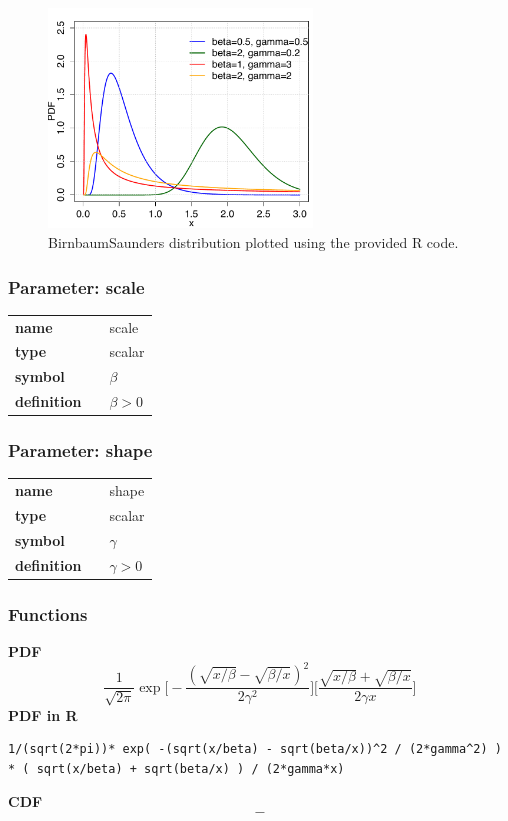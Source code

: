 \begin{figure}[ht!]
\centering
  \includegraphics[width=70mm]{pics/BirnbaumSaunders.pdf}
 \caption{BirnbaumSaunders distribution plotted using the provided R code.}
 \label{fig:BirnbaumSaunders}
\end{figure}

\subsubsection*{Parameter: scale}

\noindent\begin{tabular}{p{2cm}cl}
\textbf{name} & & scale \\
\textbf{type} & & scalar \\
\textbf{symbol} & & $\beta$  \\
\textbf{definition} & & $\beta > 0$
\end{tabular}
\subsubsection*{Parameter: shape}

\noindent\begin{tabular}{p{2cm}cl}
\textbf{name} & & shape \\
\textbf{type} & & scalar \\
\textbf{symbol} & & $\gamma$  \\
\textbf{definition} & & $\gamma > 0$
\end{tabular}
\subsubsection*{Functions}

\smallskip \noindent \hspace{.2cm} \textbf{PDF} 
\begin{equation*}\frac{1}{\sqrt{2\pi}}\exp\Big[-\frac{(\sqrt{x/\beta}-\sqrt{\beta/x})^2}{2\gamma^2}\Big]\Big[\frac{\sqrt{x/\beta}+\sqrt{\beta/x}}{2\gamma x}\Big]\end{equation*}
\smallskip \noindent \hspace{.2cm} \textbf{PDF in R}  
\begin{verbatim}1/(sqrt(2*pi))* exp( -(sqrt(x/beta) - sqrt(beta/x))^2 / (2*gamma^2) ) * ( sqrt(x/beta) + sqrt(beta/x) ) / (2*gamma*x)
\end{verbatim}
\smallskip \noindent \hspace{.2cm} \textbf{CDF} 
\begin{equation*}-\end{equation*}
\smallskip
